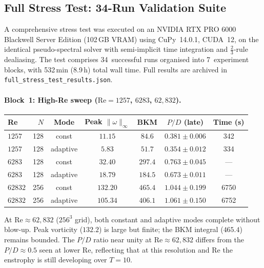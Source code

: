\subsection{Full Stress Test: 34-Run Validation Suite}
\label{app:ns:stress_test}

A comprehensive stress test was executed on an NVIDIA RTX PRO 6000
Blackwell Server Edition (102\,GB VRAM) using CuPy~14.0.1,
CUDA~12, on the identical pseudo-spectral solver with
semi-implicit time integration and $\tfrac{2}{3}$-rule dealiasing.
The test comprises 34~successful runs organised into
7~experiment blocks, with 532\,min (8.9\,h) total wall time.
Full results are archived in
\texttt{full\_stress\_test\_results.json}.

\paragraph{Block~1: High-Re sweep
($\mathrm{Re} = 1257$, $6283$, $62{,}832$).}
\begin{center}
\begin{tabular}{@{}lrccccc@{}}
\toprule
Re & $N$ & Mode & Peak $\|\omega\|_\infty$ & BKM
   & $P/D$ (late) & Time (s)\\
\midrule
$1257$   & 128 & const    & $11.15$ & $84.6$ & $0.381 \pm 0.006$ & 342\\
$1257$   & 128 & adaptive & $5.83$  & $51.7$ & $0.354 \pm 0.012$ & 334\\
$6283$   & 128 & const    & $32.40$ & $297.4$& $0.763 \pm 0.045$ & ---\\
$6283$   & 128 & adaptive & $18.79$ & $184.5$& $0.673 \pm 0.011$ & ---\\
$62832$  & 256 & const    & $132.20$& $465.4$& $1.044 \pm 0.199$ & 6750\\
$62832$  & 256 & adaptive & $105.34$& $406.1$& $1.061 \pm 0.150$ & 6752\\
\bottomrule
\end{tabular}
\end{center}
At $\mathrm{Re}\approx 62{,}832$ ($256^3$ grid), both constant
and adaptive modes complete without blow-up.  Peak vorticity
($132.2$) is large but finite; the BKM integral ($465.4$) remains
bounded.  The $P/D$ ratio near unity at $\mathrm{Re}\approx 62{,}832$
differs from the $P/D \approx 0.5$ seen at lower Re, reflecting
that at this resolution and Re the enstrophy is still developing
over $T=10$.

